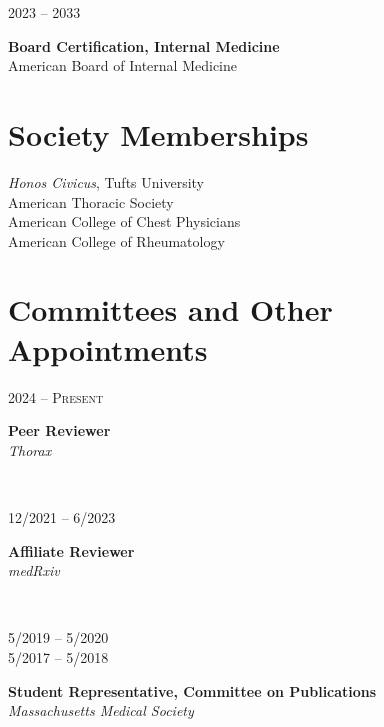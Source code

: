\documentclass{article}
\newcommand\colleft{.20}
\newcommand\colright{.75}
\newcommand{\entryfour}[4]
	{
		\begin{minipage}[t]{\colleft\textwidth}
		\hfill \textsc{#1}
		\end{minipage}
		\hfill\vline\hfill
		\begin{minipage}[t]{\colright\textwidth}
		{\bf#2}\\
		\textit{#3}
		\footnotesize{#4}
		\end{minipage}\\
		\entryvspace
	}%
\newcommand{\entrythree}[3]
{
	\begin{minipage}[t]{\colleft\textwidth}
		\hfill \textsc{#1}
	\end{minipage}
	\hfill\vline\hfill
	\begin{minipage}[t]{\colright\textwidth}
		{\bf#2}\\
		\footnotesize{#3}
	\end{minipage}
	\entryvspace
}%
\newcommand{\entryvspace}{\vspace{0.5em}}
\begin{document}
		\entrythree{2023 -- 2033}{Board Certification, Internal Medicine}{American Board of Internal Medicine}
		
	\section*{Society Memberships}
		\emph{Honos Civicus}, Tufts University\\
		American Thoracic Society\\
		American College of Chest Physicians\\
		American College of Rheumatology
		
	\section*{Committees and Other Appointments}
		\entryfour{2024 -- Present}{Peer Reviewer}{Thorax}{%
	}
	
		\entryfour{12/2021 -- 6/2023}{Affiliate Reviewer}{medRxiv}{%
		}


\begin{minipage}[t]{\colleft\textwidth}
	\vspace{0.1pc}
	\begin{flushright}
		5/2019 -- 5/2020\\
		5/2017 -- 5/2018
	\end{flushright}
\end{minipage}
\hfill\vline \hspace*{0.27pc}
\begin{minipage}[t]{\colright\textwidth}
	{\bf Student Representative, Committee on Publications}\\
	\textit{Massachusetts Medical Society}
	\footnotesize{%
	}
\end{minipage}
\entryvspace
\end{document}
